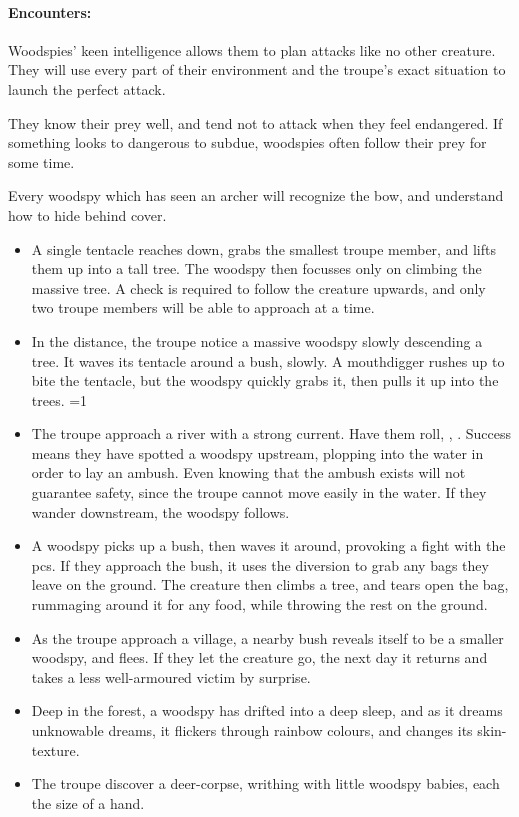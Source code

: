\begin{multicols}{2}
\paragraph{Encounters:} Woodspies' keen intelligence allows them to plan attacks like no other creature.
They will use every part of their environment and the troupe's exact situation to launch the perfect attack.

They know their prey well, and tend not to attack when they feel endangered.
If something looks to dangerous to subdue, woodspies often follow their prey for some time.

Every woodspy which has seen an archer will recognize the bow, and understand how to hide behind cover.

\begin{itemize}
  \item
  A single tentacle reaches down, grabs the smallest troupe member, and lifts them up into a tall tree.
  The woodspy then focusses only on climbing the massive tree.
  A  check is required to follow the creature upwards, and only two troupe members will be able to approach at a time.
  \item
  In the distance, the troupe notice a massive woodspy slowly descending a tree.
  It waves its tentacle around a bush, slowly.
  A mouthdigger rushes up to bite the tentacle, but the woodspy quickly grabs it, then pulls it up into the trees.
  \ifnum\value{temperature}=1
    \item
    The troupe approach a river with a strong current.
    Have them roll, , \tn[9].
    Success means they have spotted a woodspy upstream, plopping into the water in order to lay an ambush.
    Even knowing that the ambush exists will not guarantee safety, since the troupe cannot move easily in the water.
    If they wander downstream, the woodspy follows.
    \item
    A woodspy picks up a bush, then waves it around, provoking a fight with the \glspl{pc}.
    If they approach the bush, it uses the diversion to grab any bags they leave on the ground.
    The creature then climbs a tree, and tears open the bag, rummaging around it for any food, while throwing the rest on the ground.
  \else
    \item
    As the troupe approach a village, a nearby bush reveals itself to be a smaller woodspy, and flees.
    If they let the creature go, the next day it returns and takes a less well-armoured victim by surprise.
    \item
    Deep in the forest, a woodspy has drifted into a deep sleep, and as it dreams unknowable dreams, it flickers through rainbow colours, and changes its skin-texture.
    \item
    The troupe discover a deer-corpse, writhing with little woodspy babies, each the size of a hand.
  \fi
\end{itemize}

\end{multicols}

